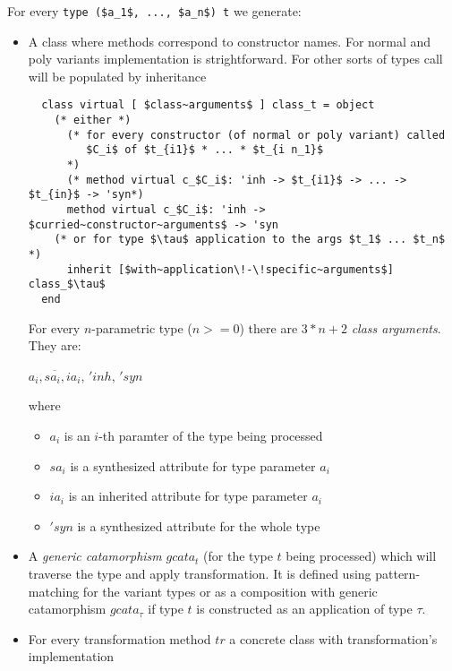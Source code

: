 \documentclass[acmsmall,review,anonymous]{acmart}\settopmatter{printfolios=true,printccs=false,printacmref=false}
\begin{document}
For every \lstinline{type ($a_1$, ..., $a_n$) t} we generate:
\begin{itemize}
  \item A class where methods correspond to constructor names. For normal and poly variants implementation is strightforward. For other sorts of types call will be populated by inheritance
  \begin{lstlisting}
  class virtual [ $class~arguments$ ] class_t = object
    (* either *)
      (* for every constructor (of normal or poly variant) called
         $C_i$ of $t_{i1}$ * ... * $t_{i n_1}$
      *)
      (* method virtual c_$C_i$: 'inh -> $t_{i1}$ -> ... ->  $t_{in}$ -> 'syn*)
      method virtual c_$C_i$: 'inh -> $curried~constructor~arguments$ -> 'syn
    (* or for type $\tau$ application to the args $t_1$ ... $t_n$ *)
      inherit [$with~application\!-\!specific~arguments$] class_$\tau$
  end
  \end{lstlisting}

  For every $n$-parametric type ($n>=0$) there are $3*n+2$ \textit{class arguments}. They are:
\begin{center}
    $\overline{a_i, sa_i, ia_i}$, $'inh$, $'syn$
\end{center}
  where \begin{itemize}
          \item $a_i$ is an $i$-th paramter of the type being processed
          \item $sa_i$ is a synthesized attribute for type parameter $a_i$
          \item $ia_i$ is an inherited attribute for type parameter $a_i$
          \item $'syn$ is a synthesized attribute for the whole type
  \end{itemize}
  \item A \textit{generic catamorphism} $gcata_t$ (for the type $t$ being processed) which will traverse the type and apply transformation. It is defined using pattern-matching for the variant types or as a composition with generic catamorphism $gcata_\tau$ if type $t$ is constructed as an application of type $\tau$.
  \item For every transformation method $tr$ a concrete class with transformation's implementation


\end{itemize}
\end{document}
